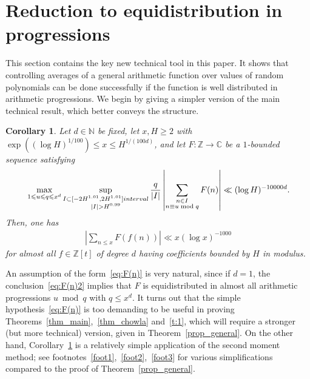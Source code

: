 \documentclass[11pt,letterpaper]{amsart}
\renewcommand{\leq}{\leqslant}
\renewcommand{\geq}{\geqslant}
\newtheorem{corollary}[theorem]{Corollary}
\theoremstyle{definition}
\numberwithin{equation}{section}
\newcommand\Z{\mathbb{Z}}
\DeclareMathOperator{\n}{N}
\newcommand{\0}{\mathbf{0}}
\begin{document}
\section{Reduction to equidistribution in progressions}\label{sec:equidistribution}

This section contains the key new technical tool in this paper. It shows that 
controlling averages of a general arithmetic function over values of  random polynomials can be done successfully 
if  the function is well distributed in arithmetic progressions. 
We begin by giving a simpler version of the main technical result, which better conveys  the structure. 

\begin{corollary} \label{cor:simpler} 
Let  $d\in \mathbb N$ be fixed, let $x,H\geq 2$ with  
$\exp((\log H)^{1/100})\leq x\leq H^{1/(100d)}$, 
and let $F:\Z\to\mathbb{C}$ be a $1$-bounded sequence satisfying 
  \begin{align}\label{eq:F(n)}
  \max_{ 1\leq u\leq q\leq x^d} 
\sup_{\substack{
I \subset [-2H^{1.01}, 2H^{1.01}] \textnormal{ interval }   
\\
|I|> H^{0.99}
}}
\frac{q}{|I|}
\left|\sum_{\substack{n\in I\\n\equiv u\bmod q}}F(n)\right|\ll (\log H)^{-10000d}.
\end{align}
Then,  one has 
\begin{align}\label{eq:F(n)2}
 \left|\sum_{n \leq x} F(f(n ) )\right|   \ll  x(\log x)^{-1000}
\end{align}
for almost all $f\in \Z[t]$ of degree $d$ having  coefficients  bounded by $H$ in   modulus.
\end{corollary}


An assumption of the form~\eqref{eq:F(n)} is very natural, since if $d=1$, the conclusion~\eqref{eq:F(n)2} implies that $F$ is equidistributed in almost all arithmetic progressions $u\bmod q$ with $q\leq x^d$. 
It turns out that the simple hypothesis~\eqref{eq:F(n)} is too demanding to be useful in proving Theorems~\ref{thm_main},~\ref{thm_chowla} and~\ref{t:1}, which will require 
a stronger (but more technical) version, given in Theorem~\ref{prop_general}. On the other hand, 
Corollary~\ref{cor:simpler} is a relatively simple application of the second moment method; see footnotes~\ref{foot1},~\ref{foot2},~\ref{foot3} for various simplifications compared to the proof of  Theorem~\ref{prop_general}.  
\end{document}
